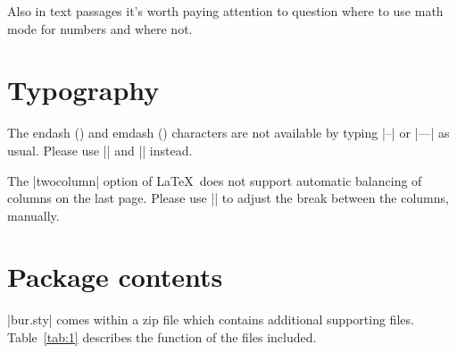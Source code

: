\documentclass{article}
\begin{document}
  Also in text passages it's worth paying attention to question where to use
  math mode for numbers and where not.


\section*{Typography}

  The endash (\endash) and emdash (\emdash) characters are not available by
  typing |--| or |---| as usual. Please use |\endash| and |\emdash| instead.

  The |twocolumn| option of \LaTeX\ does not support automatic balancing of
  columns on the last page. Please use |\newpage| to adjust the break between
  the columns, manually.


\section*{Package contents}

  |bur.sty| comes within a zip file which contains additional supporting
  files. Table~\ref{tab:1} describes the function of the files included.

\vspace*{2mm}



\end{document}
